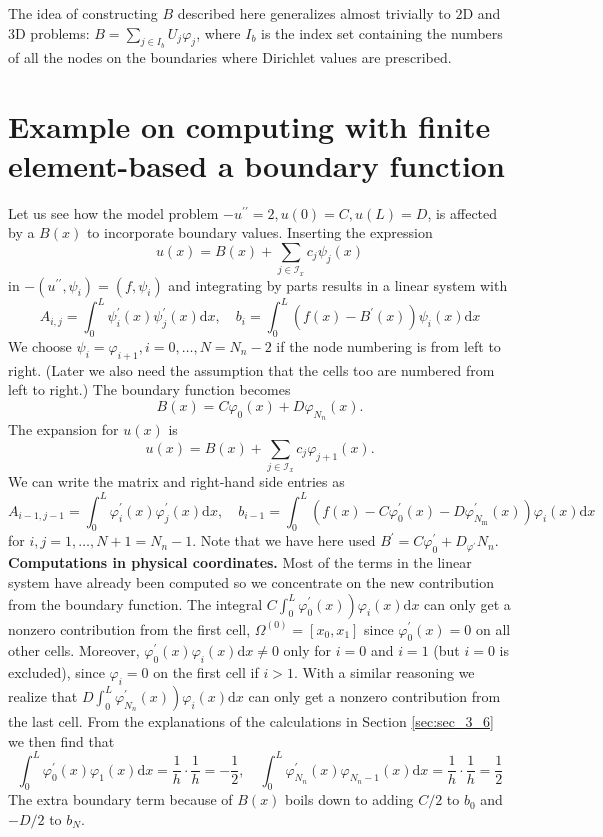\documentclass[../main.tex]{subfiles}
\begin{document}
		The idea of constructing $B$ described here generalizes almost trivially to $2 \mathrm{D}$ and 3D problems: $B=\sum_{j \in I_{b}} U_{j} \varphi_{j}$, where $I_{b}$ is the index set containing the numbers of all the nodes on the boundaries where Dirichlet values are prescribed.
		
	\section[Example on computing with finite element-based a boundary function]{Example on computing with finite element-based a boundary function}
		\label{sec:sec_14_2}
		\noindent Let us see how the model problem $-u^{\prime \prime}=2, u(0)=C, u(L)=D$, is affected by a $B(x)$ to incorporate boundary values. Inserting the expression
		$$
		u(x)=B(x)+\sum_{j \in \mathcal{I}_{x}} c_{j} \psi_{j}(x)
		$$
		in $-\left(u^{\prime \prime}, \psi_{i}\right)=\left(f, \psi_{i}\right)$ and integrating by parts results in a linear system with
		$$
		A_{i, j}=\int_{0}^{L} \psi_{i}^{\prime}(x) \psi_{j}^{\prime}(x) \mathrm{d} x, \quad b_{i}=\int_{0}^{L}\left(f(x)-B^{\prime}(x)\right) \psi_{i}(x) \mathrm{d} x
		$$
		We choose $\psi_{i}=\varphi_{i+1}, i=0, \ldots, N=N_{n}-2$ if the node numbering is from left to right. (Later we also need the assumption that the cells too are numbered from left to right.) The boundary function becomes
		$$
		B(x)=C \varphi_{0}(x)+D \varphi_{N_{n}}(x) .
		$$
		The expansion for $u(x)$ is
		$$
		u(x)=B(x)+\sum_{j \in \mathcal{I}_{x}} c_{j} \varphi_{j+1}(x) .
		$$
		We can write the matrix and right-hand side entries as
		$$
		A_{i-1, j-1}=\int_{0}^{L} \varphi_{i}^{\prime}(x) \varphi_{j}^{\prime}(x) \mathrm{d} x, \quad b_{i-1}=\int_{0}^{L}\left(f(x)-C \varphi_{0}^{\prime}(x)-D \varphi_{N_{\mathrm{m}}}^{\prime}(x)\right) \varphi_{i}(x) \mathrm{d} x
		$$
		for $i, j=1, \ldots, N+1=N_{n}-1$. Note that we have here used $B^{\prime}=C \varphi_{0}^{\prime}+D_{\varphi^{\prime}} N_{n}$.\bigbreak
		\textbf{Computations in physical coordinates.   } Most of the terms in the linear system have already been computed so we concentrate on the new contribution from the boundary function. The integral $\left.C \int_{0}^{L} \varphi_{0}^{\prime}(x)\right) \varphi_{i}(x) \mathrm{d} x$ can only get a nonzero contribution from the first cell, $\Omega^{(0)}=\left[x_{0}, x_{1}\right]$ since $\varphi_{0}^{\prime}(x)=0$ on all other cells. Moreover, $\varphi_{0}^{\prime}(x) \varphi_{i}(x) \mathrm{d} x \neq 0$ only for $i=0$ and $i=1$ (but $i=0$ is excluded), since $\varphi_{i}=0$ on the first cell if $i>1$. With a similar reasoning we realize that $\left.D \int_{0}^{L} \varphi_{N_{n}}^{\prime}(x)\right) \varphi_{i}(x) \mathrm{d} x$ can only get a nonzero contribution from the last cell. From the explanations of the calculations in Section \ref{sec:sec_3_6} we then find that
		$$
		\int_{0}^{L} \varphi_{0}^{\prime}(x) \varphi_{1}(x) \mathrm{d} x=\frac{1}{h} \cdot \frac{1}{h}=-\frac{1}{2}, \quad \int_{0}^{L} \varphi_{N_{n}}^{\prime}(x) \varphi_{N_{n}-1}(x) \mathrm{d} x=\frac{1}{h} \cdot \frac{1}{h}=\frac{1}{2}
		$$
		The extra boundary term because of $B(x)$ boils down to adding $C / 2$ to $b_{0}$ and $-D / 2$ to $b_{N}$.\bigbreak 
		
\end{document}
